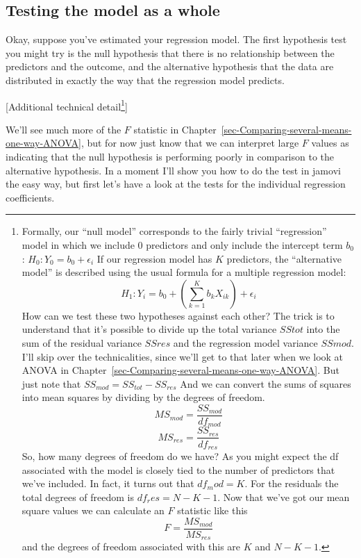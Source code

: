 \documentclass[
  a4paper,
]{book}
\begin{document}
\hypertarget{testing-the-model-as-a-whole}{%
\subsection{Testing the model as a
whole}\label{testing-the-model-as-a-whole}}

Okay, suppose you've estimated your regression model. The first
hypothesis test you might try is the null hypothesis that there is no
relationship between the predictors and the outcome, and the alternative
hypothesis that the data are distributed in exactly the way that the
regression model predicts.

{[}Additional technical detail\footnote{Formally, our ``null model''
  corresponds to the fairly trivial ``regression'' model in which we
  include 0 predictors and only include the intercept term \(b_0\):
  \(H_0:Y_0=b_0+\epsilon_i\) If our regression model has \(K\)
  predictors, the ``alternative model'' is described using the usual
  formula for a multiple regression model:
  \[H_1:Y_i=b_0+(\sum_{k=1}^K b_k X_{ik})+\epsilon_i\] How can we test
  these two hypotheses against each other? The trick is to understand
  that it's possible to divide up the total variance \(SStot\) into the
  sum of the residual variance \(SSres\) and the regression model
  variance \(SSmod\). I'll skip over the technicalities, since we'll get
  to that later when we look at ANOVA in
  Chapter~\ref{sec-Comparing-several-means-one-way-ANOVA}. But just note
  that \(SS_{mod}=SS_{tot}-SS_{res}\) And we can convert the sums of
  squares into mean squares by dividing by the degrees of freedom.
  \[MS_{mod}=\frac{SS_{mod}}{df_{mod}}\]
  \[MS_{res}=\frac{SS_{res}}{df_{res}}\] So, how many degrees of freedom
  do we have? As you might expect the df associated with the model is
  closely tied to the number of predictors that we've included. In fact,
  it turns out that \(df_mod = K\). For the residuals the total degrees
  of freedom is \(df_res = N - K - 1\). Now that we've got our mean
  square values we can calculate an \(F\) statistic like this
  \[F=\frac{MS_{mod}}{MS_{res}}\] and the degrees of freedom associated
  with this are \(K\) and \(N - K - 1\).}{]}

We'll see much more of the \(F\) statistic in
Chapter~\ref{sec-Comparing-several-means-one-way-ANOVA}, but for now
just know that we can interpret large \(F\) values as indicating that
the null hypothesis is performing poorly in comparison to the
alternative hypothesis. In a moment I'll show you how to do the test in
jamovi the easy way, but first let's have a look at the tests for the
individual regression coefficients.
\end{document}
